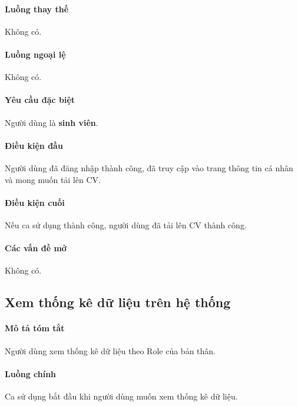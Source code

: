 \documentclass[./../main.tex]{subfiles}
\begin{document}
\paragraph*{Luồng thay thế} Không có.

\paragraph*{Luồng ngoại lệ} Không có.

\paragraph*{Yêu cầu đặc biệt}

Người dùng là \textbf{sinh viên}.

\paragraph*{Điều kiện đầu}

Người dùng đã đăng nhập thành công, đã truy cập vào trang thông tin cá nhân và mong muốn tải lên CV.

\paragraph*{Điều kiện cuối}

Nếu ca sử dụng thành công, người dùng đã tải lên CV thành công.

\paragraph*{Các vấn đề mở}

Không có.

\subsection{Xem thống kê dữ liệu trên hệ thống}

\paragraph*{Mô tả tóm tắt}

Người dùng xem thống kê dữ liệu theo Role của bản thân.

\paragraph*{Luồng chính} Ca sử dụng bắt đầu khi người dùng muốn xem thống kê dữ liệu.
\end{document}
